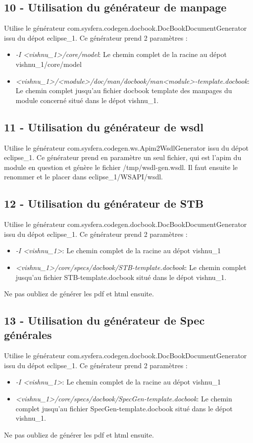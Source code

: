 \documentclass{article}
\begin{document}
\subsection{10 - Utilisation du générateur de manpage}
Utilise le générateur com.sysfera.codegen.docbook.DocBookDocumentGenerator
issu du dépot eclipse\_1. Ce générateur prend 2 paramètres :
\begin{itemize}
\item \textit{-I <vishnu\_1>/core/model}: Le chemin complet de la racine au dépot 
vishnu\_1/core/model
\item \textit{<vishnu\_1>/<module>/doc/man/docbook/man<module>-template.docbook}:
 Le chemin complet jusqu'au fichier docbook template des manpages du module 
 concerné situé dans le dépot vishnu\_1.
\end{itemize}

\subsection{11 - Utilisation du générateur de wsdl}
Utilise le générateur com.sysfera.codegen.ws.Apim2WsdlGenerator issu du
dépot eclipse\_1. Ce générateur prend en paramètre un seul fichier, qui
est l'apim du module en question et génère le fichier /tmp/wsdl-gen.wsdl.
Il faut ensuite le renommer et le placer dans eclipse\_1/WSAPI/wsdl.

\subsection{12 - Utilisation du générateur de STB}
Utilise le générateur com.sysfera.codegen.docbook.DocBookDocumentGenerator
issu du dépot eclipse\_1. Ce générateur prend 2 paramètres :
\begin{itemize}
\item \textit{-I <vishnu\_1>}: Le chemin complet de la racine au dépot 
vishnu\_1
\item \textit{<vishnu\_1>/core/specs/docbook/STB-template.docbook}:
 Le chemin complet jusqu'au fichier STB-template.docbook
 situé dans le dépot vishnu\_1.
\end{itemize}
Ne pas oubliez de générer les pdf et html ensuite.

\subsection{13 - Utilisation du générateur de Spec générales}
Utilise le générateur com.sysfera.codegen.docbook.DocBookDocumentGenerator
issu du dépot eclipse\_1. Ce générateur prend 2 paramètres :
\begin{itemize}
\item \textit{-I <vishnu\_1>}: Le chemin complet de la racine au dépot 
vishnu\_1
\item \textit{<vishnu\_1>/core/specs/docbook/SpecGen-template.docbook}:
 Le chemin complet jusqu'au fichier SpecGen-template.docbook
 situé dans le dépot vishnu\_1.
\end{itemize}
Ne pas oubliez de générer les pdf et html ensuite.
\end{document}
